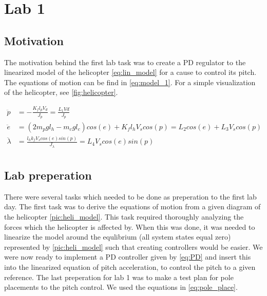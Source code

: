 \section{Lab 1}
\subsection{Motivation}\label{sec:lab1_mot}
The motivation behind the first lab task was to create a PD regulator to the linearized
model of the helicopter \ref{eq:lin_model} for a cause to control its pitch. The equations
of motion can be find in \ref{eq:model_1}. For a simple visualization of the helicopter, see \ref{fig:helicopter}.

\begin{subequations}\label{eq:model_1}
	\begin{align}
		\ddot{p}  &= -\frac{K_{f}l_{p}V_{d}}{J_{p}} = \frac{L_1Vd}{J_p} \label{eq:model_1_p} \\
		\ddot{e}  &= (2m_pgl_h-m_cgl_c)cos(e)+K_fl_hV_scos(p) = L_2cos(e)+L_3V_scos(p)\label{eq:model_1_e} \\
		\ddot{\lambda} &= \frac{l_hk_fV_scos(e)sin(p)}{J_{\lambda}} = L_4V_scos(e)sin(p) \label{eq:model_1_l} \\
	\end{align}
\end{subequations}

\subsection{Lab preperation}\label{sec:lab1_prep}
There were several tasks which needed to be done as preperation to the first lab day.
The first task was to derive the equations of motion from a given diagram of the helicopter \ref{pic:heli_model}.
This task required thoroughly analyzing the forces which the helicopter is affected by.
When this was done, it was needed to linearize the model around the equlibrium (all system states equal zero) represented by \ref{pic:heli_model} such that 
creating controllers would be easier. We were now ready to implement a PD controller given by \ref{eq:PD}
and insert this into the linearized equation of pitch acceleration, to control the pitch to a given reference.
The last preperation for lab 1 was to make a test plan for pole placements to the pitch control. We used the equations in \ref{eq:pole_place}.

